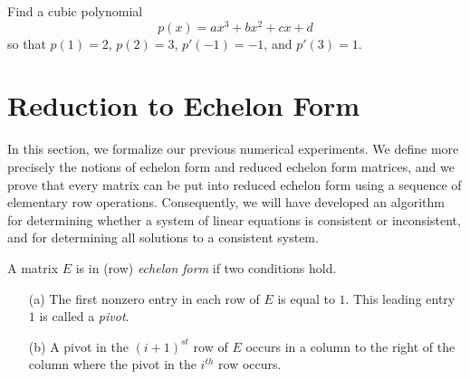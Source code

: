 \begin{exercise} \label{c2.3.5}
Find a cubic polynomial
\[
p(x) = ax^3 + bx^2 + cx + d
\]
so that $p(1)=2$, $p(2)=3$, $p'(-1)=-1$, and $p'(3)=1$.
\end{exercise}



\section{Reduction to Echelon Form}
\label{S:2.4}

In this section, we formalize our previous numerical
experiments.  We define more precisely the notions of echelon
form and reduced echelon form matrices, and we prove that every
matrix can be put into reduced echelon form using a sequence of
elementary row operations.  Consequently, we will have developed
an algorithm for determining whether a system of linear
equations is consistent or inconsistent, and for determining all
solutions to a consistent system.

\begin{Def}
A matrix $E$ is in (row) {\em echelon form\/}  if two conditions hold.
\begin{enumerate}
\item[(a)] The first nonzero entry in each row of $E$ is equal
to $1$.  This leading entry $1$ is called a {\em pivot\/}. 
\item[(b)] A pivot in the $(i+1)^{st}$ row of $E$ occurs in a column to
the right of the column where the pivot in the $i^{th}$ row occurs.
\end{enumerate}
\end{Def}

